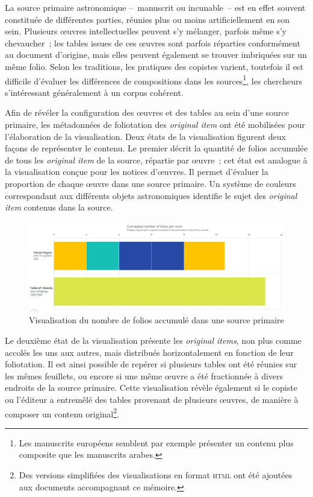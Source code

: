 \documentclass[a4paper,12pt,twoside]{book}
\newcommand{\eng}{\emph}
\newcommand{\oi}{\eng{original item}\xspace}
\newcommand{\ois}{\eng{original items}\xspace}
\newcommand{\html}{\textsc{html}\xspace}
\begin{document}
La source primaire astronomique –~manuscrit ou incunable~– est en effet souvent constituée de différentes parties, réunies plus ou moins artificiellement en son sein. Plusieurs œuvres intellectuelles peuvent s'y mélanger, parfois même s'y chevaucher~; les tables issues de ces œuvres sont parfois réparties conformément au document d'origine, mais elles peuvent également se trouver imbriquées sur un même folio. Selon les traditions, les pratiques des copistes varient, toutefois il est difficile d'évaluer les différences de compositions dans les sources\footnote{Les manuscrits européens semblent par exemple présenter un contenu plus composite que les manuscrits arabes.}, les chercheurs s'intéressant généralement à un corpus cohérent.

Afin de révéler la configuration des œuvres et des tables au sein d'une source primaire, les métadonnées de foliotation des \oi ont été mobilisées pour l'élaboration de la visualisation. Deux états de la visualisation figurent deux façons de représenter le contenu. Le premier décrit la quantité de folios accumulée de tous les \oi de la source, répartie par œuvre~; cet état est analogue à la visualisation conçue pour les notices d'œuvres. Il permet d'évaluer la proportion de chaque œuvre dans une source primaire. Un système de couleurs correspondant aux différents objets astronomiques identifie le sujet des \oi contenus dans la source.

\begin{figure}[H]
	\centering
	\includegraphics[width=16cm]{Images/Visualisations/Primary_source-Stacked.png}
	\caption{Visualisation du nombre de folios accumulé dans une source primaire}
\end{figure}

Le deuxième état de la visualisation présente les \ois, non plus comme accolés les uns aux autres, mais distribués horizontalement en fonction de leur foliotation. Il est ainsi possible de repérer si plusieurs tables ont été réunies sur les mêmes feuillets, ou encore si une même œuvre a été fractionnée à divers endroits de la source primaire. Cette visualisation révèle également si le copiste ou l'éditeur a entremêlé des tables provenant de plusieurs œuvres, de manière à composer un contenu original\footnote{Des versions simplifiées des visualisations en format \html ont été ajoutées aux documents accompagnant ce mémoire.}.
\end{document}
